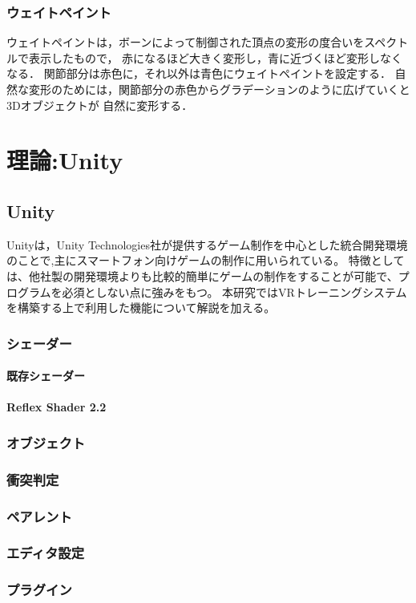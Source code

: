\documentclass{ltjsreport}
\begin{document}
		\subsection{ウェイトペイント}
			ウェイトペイントは，ボーンによって制御された頂点の変形の度合いをスペクトルで表示したもので，
			赤になるほど大きく変形し，青に近づくほど変形しなくなる．
			関節部分は赤色に，それ以外は青色にウェイトペイントを設定する．
			自然な変形のためには，関節部分の赤色からグラデーションのように広げていくと3Dオブジェクトが
			自然に変形する．

\chapter{理論:Unity}
	\section{Unity}
		Unityは，Unity Technologies社が提供するゲーム制作を中心とした統合開発環境のことで,主にスマートフォン向けゲームの制作に用いられている。
		特徴としては、他社製の開発環境よりも比較的簡単にゲームの制作をすることが可能で、プログラムを必須としない点に強みをもつ。
		本研究ではVRトレーニングシステムを構築する上で利用した機能について解説を加える。
		\subsection{シェーダー}
			\subsubsection{既存シェーダー}
			\subsubsection{Reflex Shader 2.2}
		\subsection{オブジェクト}
		\subsection{衝突判定}
		\subsection{ペアレント}
		\subsection{エディタ設定}
		\subsection{プラグイン}
\end{document}
